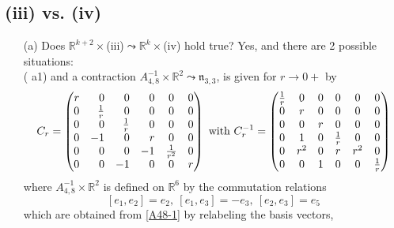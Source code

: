 \documentclass[
reqno]{amsart}
\begin{document}
\subsection{(iii) vs. (iv)}\label{Case9}\hfill
\begin{itemize}
\item[(a)] Does ${{\mathbb R}}^{k+2}\times$(iii)${\leadsto}$${{\mathbb R}}^k\times$(iv) hold true?  
Yes, and there are 2 possible situations: 
\\ ({{\bfseries\itshape} a1})  
and a contraction $A_{4,8}^{-1}\times{{\mathbb R}}^2{\leadsto} {{\mathfrak n}}_{3,3}$, 
is given for $r\to 0+$ by 
$$C_r
=\begin{pmatrix}
\hfill r & \hfill 0           & \hfill 0           & \hfill 0 & 0             & 0 \\
\hfill 0 & \hfill \frac{1}{r} & \hfill 0           & \hfill 0 & 0             & 0 \\
\hfill 0 & \hfill 0           & \hfill \frac{1}{r} & \hfill 0 & 0             & 0 \\
\hfill 0 &       -1           & \hfill 0           & \hfill r & 0             & 0 \\
       0 & \hfill 0           & \hfill 0           & -1       & \frac{1}{r^2} & 0 \\
\hfill 0 & \hfill 0           & -1                 & \hfill 0 & 0             & r 
\end{pmatrix}
\text{ with }
C_r^{-1}=
\begin{pmatrix}
 \frac{1}{r}  &  0             & 0 & 0           & 0   & 0 \\
 0            &  r             & 0 & 0           & 0   & 0 \\
 0            &  0             & r & 0           & 0   & 0 \\
 0            &  1             & 0 & \frac{1}{r} & 0   & 0 \\
 0            &  r^2           & 0 & r           & r^2 & 0 \\
 0            &  0             & 1 & 0           & 0   & \frac{1}{r} 
 \end{pmatrix}
$$
where $A_{4,8}^{-1}\times{{\mathbb R}}^2$ is defined on ${{\mathbb R}}^6$ by the commutation relations 
\begin{equation}\label{A48-1bis}
[e_1,e_2]=e_2,\ [e_1,e_3]=-e_3,\ [e_2,e_3]=e_5 
\end{equation}
which are obtained from \eqref{A48-1} by relabeling the basis vectors, 
$$
\end{itemize}
\end{document}
